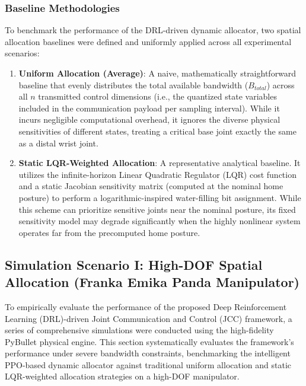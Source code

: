 \subsubsection{Baseline Methodologies}
To benchmark the performance of the DRL-driven dynamic allocator, two spatial allocation baselines were defined and uniformly applied across all experimental scenarios:
\begin{enumerate}
    \item \textbf{Uniform Allocation (Average)}: A naive, mathematically straightforward baseline that evenly distributes the total available bandwidth ($B_{total}$) across all $n$ transmitted control dimensions (i.e., the quantized state variables included in the communication payload per sampling interval). While it incurs negligible computational overhead, it ignores the diverse physical sensitivities of different states, treating a critical base joint exactly the same as a distal wrist joint.
    \item \textbf{Static LQR-Weighted Allocation}: A representative analytical baseline. It utilizes the infinite-horizon Linear Quadratic Regulator (LQR) cost function and a static Jacobian sensitivity matrix (computed at the nominal home posture) to perform a logarithmic-inspired water-filling bit assignment. While this scheme can prioritize sensitive joints near the nominal posture, its fixed sensitivity model may degrade significantly when the highly nonlinear system operates far from the precomputed home posture.
\end{enumerate}
\subsection{Simulation Scenario I: High-DOF Spatial Allocation (Franka Emika Panda Manipulator)}\label{sec:s1}
To empirically evaluate the performance of the proposed Deep Reinforcement Learning (DRL)-driven Joint Communication and Control (JCC) framework, 
a series of comprehensive simulations were conducted using the high-fidelity PyBullet physical engine. 
This section systematically evaluates the framework's performance under severe bandwidth constraints, benchmarking the intelligent PPO-based dynamic allocator against traditional uniform allocation and static LQR-weighted allocation strategies on a high-DOF manipulator.
